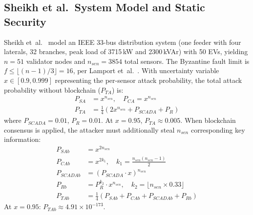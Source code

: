 \documentclass[10pt,twocolumn,letterpaper]{article}
\begin{document}
\begin{enumerate}[leftmargin=*]
\subsection{Sheikh et al.\ System Model and Static Security}
Sheikh et~al.~\cite{sheikh2020} model an IEEE 33-bus distribution system (one feeder with four laterals, 32 branches, peak load of 3715\,kW and 2300\,kVAr) with 50 EVs, yielding $n = 51$ validator nodes and $n_{sen} = 3854$ total sensors. The Byzantine fault limit is $f \leq \lfloor(n-1)/3\rfloor = 16$, per Lamport et~al.~\cite{lamport1982}.
With uncertainty variable $x \in [0.9, 0.999]$ representing the per-sensor attack probability, the total attack probability without blockchain ($P_{TA}$) is:
\begin{align}
P_{SA} &= x^{n_{sen}}, \quad P_{CA} = x^{n_{sen}} \tag{Eq.~14, 15} \\
P_{TA} &= \frac{1}{4}\left(2x^{n_{sen}} + P_{SCADA} + P_R\right) \tag{Eq.~16}
\end{align}
where $P_{SCADA} = 0.01$, $P_R = 0.01$. At $x = 0.95$, $P_{TA} \approx 0.005$.
When blockchain consensus is applied, the attacker must additionally steal $n_{sen}$ corresponding key information:
\begin{align}
P_{SAb} &= x^{2n_{sen}} \tag{Eq.~17} \\
P_{CAb} &= x^{2k_1}, \quad k_1 = \frac{n_{sen}(n_{sen}-1)}{2} \tag{Eq.~18} \\
P_{SCADAb} &= (P_{SCADA} \cdot x)^{n_{sen}} \tag{Eq.~19} \\
P_{Rb} &= P_R^{k_2} \cdot x^{n_{sen}}, \quad k_2 = \lfloor n_{sen} \times 0.33 \rfloor \tag{Eq.~20} \\
P_{TAb} &= \frac{1}{4}\left(P_{SAb} + P_{CAb} + P_{SCADAb} + P_{Rb}\right) \tag{Eq.~21}
\end{align}
At $x = 0.95$: $P_{TAb} \approx 4.91 \times 10^{-173}$.


\end{enumerate}
\end{document}
